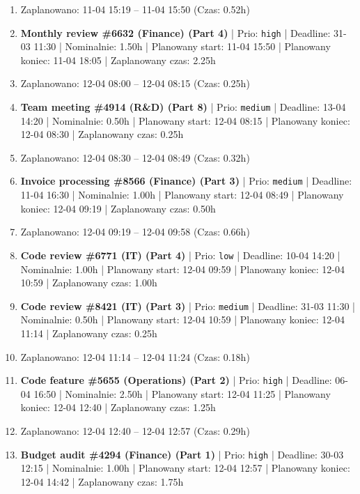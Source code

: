 {\begin{enumerate}
  \item [\textbf{PRZERWA}] Zaplanowano: 11-04 15:19 -- 11-04 15:50 (Czas: 0.52h)
  \item [\textbf{14615}] \textbf{Monthly review \#6632 (Finance) (Part 4)} | Prio: \texttt{high} | Deadline: 31-03 11:30 | Nominalnie: 1.50h | Planowany start: 11-04 15:50 | Planowany koniec: 11-04 18:05 | Zaplanowany czas: 2.25h
  \item [\textbf{PRZERWA}] Zaplanowano: 12-04 08:00 -- 12-04 08:15 (Czas: 0.25h)
  \item [\textbf{14638}] \textbf{Team meeting \#4914 (R\&D) (Part 8)} | Prio: \texttt{medium} | Deadline: 13-04 14:20 | Nominalnie: 0.50h | Planowany start: 12-04 08:15 | Planowany koniec: 12-04 08:30 | Zaplanowany czas: 0.25h
  \item [\textbf{PRZERWA}] Zaplanowano: 12-04 08:30 -- 12-04 08:49 (Czas: 0.32h)
  \item [\textbf{14675}] \textbf{Invoice processing \#8566 (Finance) (Part 3)} | Prio: \texttt{medium} | Deadline: 11-04 16:30 | Nominalnie: 1.00h | Planowany start: 12-04 08:49 | Planowany koniec: 12-04 09:19 | Zaplanowany czas: 0.50h
  \item [\textbf{PRZERWA}] Zaplanowano: 12-04 09:19 -- 12-04 09:58 (Czas: 0.66h)
  \item [\textbf{14681}] \textbf{Code review \#6771 (IT) (Part 4)} | Prio: \texttt{low} | Deadline: 10-04 14:20 | Nominalnie: 1.00h | Planowany start: 12-04 09:59 | Planowany koniec: 12-04 10:59 | Zaplanowany czas: 1.00h
  \item [\textbf{14665}] \textbf{Code review \#8421 (IT) (Part 3)} | Prio: \texttt{medium} | Deadline: 31-03 11:30 | Nominalnie: 0.50h | Planowany start: 12-04 10:59 | Planowany koniec: 12-04 11:14 | Zaplanowany czas: 0.25h
  \item [\textbf{PRZERWA}] Zaplanowano: 12-04 11:14 -- 12-04 11:24 (Czas: 0.18h)
  \item [\textbf{14626}] \textbf{Code feature \#5655 (Operations) (Part 2)} | Prio: \texttt{high} | Deadline: 06-04 16:50 | Nominalnie: 2.50h | Planowany start: 12-04 11:25 | Planowany koniec: 12-04 12:40 | Zaplanowany czas: 1.25h
  \item [\textbf{PRZERWA}] Zaplanowano: 12-04 12:40 -- 12-04 12:57 (Czas: 0.29h)
  \item [\textbf{14619}] \textbf{Budget audit \#4294 (Finance) (Part 1)} | Prio: \texttt{high} | Deadline: 30-03 12:15 | Nominalnie: 1.00h | Planowany start: 12-04 12:57 | Planowany koniec: 12-04 14:42 | Zaplanowany czas: 1.75h

\end{enumerate}}
